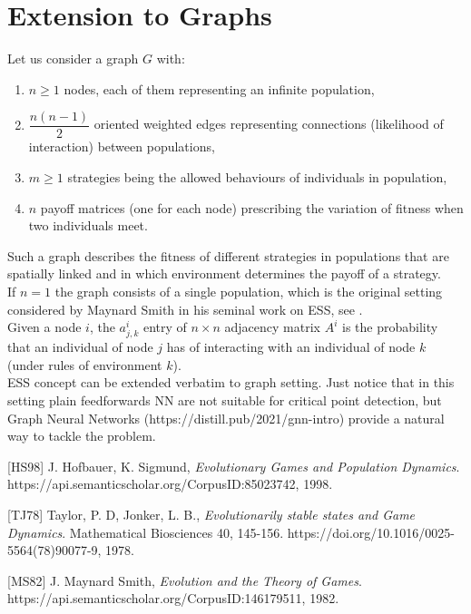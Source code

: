 \documentclass[12pt,a4paper,twoside]{article}
\theoremstyle{plain}
\theoremstyle{definition}
\theoremstyle{remark}
\begin{document}
\section*{Extension to Graphs}
Let us consider a graph $G$ with:  
\begin{enumerate}[-]
\item  $n \geq 1$ nodes, each of them representing an infinite population, 
\item $\dfrac{n(n-1)}{2}$ oriented weighted edges representing connections (likelihood of interaction) between populations,  
\item $m\geq 1$ strategies being the allowed behaviours of individuals in population,  
\item $n$ payoff matrices (one for each node) prescribing the variation of fitness when two individuals meet.  
\end{enumerate}
Such a graph describes the fitness of different strategies in populations that are spatially linked and in which environment determines the payoff of a strategy.\\
If $n=1$ the graph consists of a single population, which is the original setting considered by Maynard Smith in his seminal work on ESS, see \cite{MS82}.\\
Given a node $i$, the $a^i_{j,k}$ entry of $n \times n$ adjacency matrix $A^i$ is the probability that an individual of node $j$ has of interacting with an individual of node $k$ (under rules of environment $k$).\\ 
ESS concept can be extended verbatim to graph setting. Just notice that in this setting plain feedforwards NN are not suitable for critical point detection, but Graph Neural Networks (https://distill.pub/2021/gnn-intro) provide a natural way to tackle the problem.
\begin{thebibliography}{999}


[HS98]
  J. Hofbauer, K. Sigmund,
  \emph{Evolutionary Games and Population Dynamics}.
  https://api.semanticscholar.org/CorpusID:85023742,
  1998.

[TJ78]
  Taylor, P. D, Jonker, L. B.,
  \emph{Evolutionarily stable states and Game Dynamics}.
  Mathematical Biosciences 40, 145-156. https://doi.org/10.1016/0025-5564(78)90077-9,
  1978.


[MS82]
  J. Maynard Smith,
  \emph{Evolution and the Theory of Games}.
  https://api.semanticscholar.org/CorpusID:146179511,
  1982.  
  
  
  

\end{thebibliography}
\end{document}
